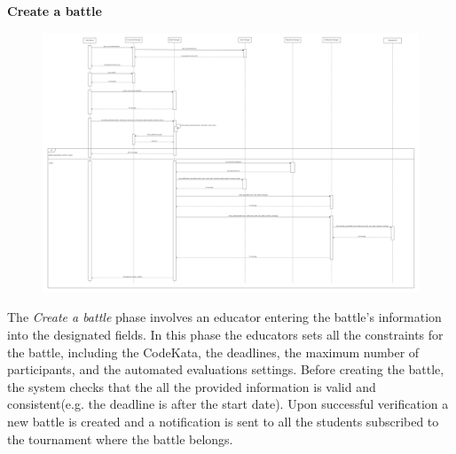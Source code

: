 \documentclass[../DD.tex]{subfiles}
\begin{document}
    \textbf{Create a battle}
    \begin{figure}[H]
        \centering
        \hspace*{-3cm}
        \includegraphics[width=1.4\textwidth]{../assets/section_2/CreateABattle.png}
    \end{figure}
    The \textit{Create a battle} phase involves an educator entering the battle's information into the designated fields.
    In this phase the educators sets all the constraints for the battle, including the CodeKata, the deadlines, the maximum number of participants, and the automated evaluations settings.
    Before creating the battle, the system checks that the all the provided information is valid and consistent(e.g. the deadline is after the start date).
    Upon successful verification a new battle is created and a notification is sent to all the students subscribed to the tournament where the battle belongs.
    \newpage
\end{document}
